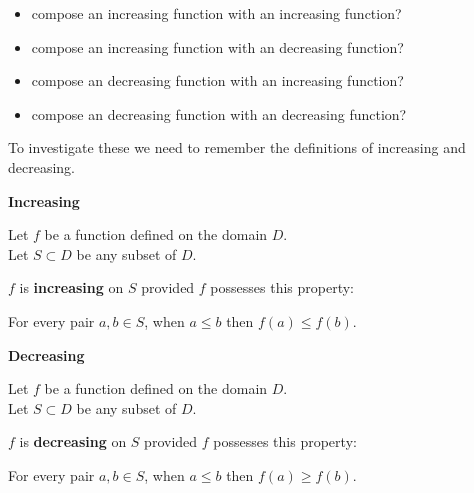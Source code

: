 \documentclass{ximera}
\begin{document}
\begin{itemize}
\item compose an increasing function with an increasing function?
\item compose an increasing function with an decreasing function?
\item compose an decreasing function with an increasing function?
\item compose an decreasing function with an decreasing function?
\end{itemize}



To investigate these we need to remember the definitions of increasing and decreasing.






\begin{summary} \textbf{\textcolor{green!50!black}{Increasing}} 


Let $f$ be a function defined on the domain $D$. \\
Let $S \subset D$ be any subset of $D$.

$f$ is \textbf{increasing} on $S$ provided $f$ possesses this property:  


\begin{center}
For every pair $a, b \in S$, when $a \leq b$ then $f(a) \leq f(b)$.
\end{center}

\end{summary}






\begin{summary} \textbf{\textcolor{green!50!black}{Decreasing}} 


Let $f$ be a function defined on the domain $D$. \\
Let $S \subset D$ be any subset of $D$.

$f$ is \textbf{decreasing} on $S$ provided $f$ possesses this property:  


\begin{center}
For every pair $a, b \in S$, when $a \leq b$ then $f(a) \geq f(b)$.
\end{center}

\end{summary}
\end{document}
